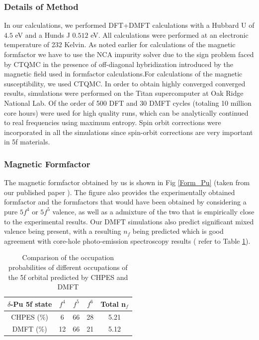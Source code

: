 \documentclass[10pt]{ruthesis}
\begin{document}
{\subsubsection{Details of Method}

In our calculations, we performed  DFT+DMFT calculations with a Hubbard U of $4.5$ eV and a Hunds J $0.512$ eV. All calculations were performed at an electronic temperature of 232 Kelvin. As noted earlier for calculations of the magnetic formfactor we have to use the NCA impurity solver due to the sign problem faced by CTQMC in the presence of off-diagonal hybridization introduced by the magnetic field used in formfactor calculations.For calculations of the magnetic susceptibility, we used CTQMC. In order to obtain highly converged converged results, simulations were performed on the Titan supercomputer at Oak Ridge National Lab. Of the order of 500 DFT and 30 DMFT cycles (totaling 10 million core hours) were used for high quality runs, which can be analytically continued to real frequencies using maximum entropy. Spin orbit corrections were incorporated in all the simulations since spin-orbit corrections are very important in 5f materials.

\subsubsection{Magnetic Formfactor}



The magnetic formfactor obtained by us is shown in Fig \ref{Form_Pu} (taken from our published paper \cite{Me_Pu}). The figure also provides the experimentally obtained formfactor and the formfactors that would have been obtained by considering a pure $5f^4$ or $5f^5$ valence, as well as a admixture of the two that is empirically close to the experimental results. Our DMFT simulations also predict significant mixed valence being present, with a resulting $n_f$  being predicted which is good agreement with core-hole photo-emission spectroscopy results \cite{Pu_CHPES} ( refer to Table \ref{Table_Pu}).



\begin{table}[H]
\begin{center}
\begin{tabular}{|c|c|c|c|c|}
\hline
$\delta$-Pu 5f state & $f^4$& $f^5$ & $f^6$ & Total n$_f$ \\
\hline
CHPES ($\%$) & 6 & 66 & 28 & 5.21\\   
\hline
DMFT ($\%$) & 12 & 66 & 21 & 5.12 \\ 
\hline
\end{tabular}
\caption{Comparison of the occupation probabilities of different occupations of the 5f orbital predicted by CHPES and DMFT \label{Table_Pu}}
\end{center}
\end{table}

}
\end{document}
